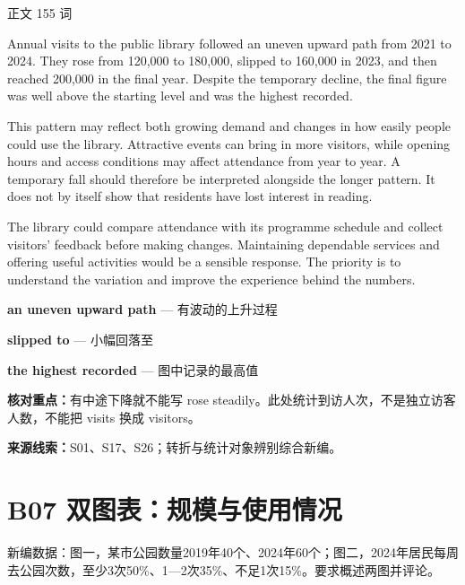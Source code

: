 \documentclass[11pt,a4paper,fontset=macnew]{ctexart}
\newenvironment{example}{\begingroup\fontsize{11}{14.3}\selectfont\setlength{\parskip}{4pt}}{\par\endgroup}
\begin{document}
\par\vspace{4pt}{\bfseries 完整套用示例}\par\nopagebreak
{\small 正文 155 词}\par
\begin{example}
Annual visits to the public library followed an uneven upward path from 2021 to 2024. They rose from 120,000 to 180,000, slipped to 160,000 in 2023, and then reached 200,000 in the final year. Despite the temporary decline, the final figure was well above the starting level and was the highest recorded.

This pattern may reflect both growing demand and changes in how easily people could use the library. Attractive events can bring in more visitors, while opening hours and access conditions may affect attendance from year to year. A temporary fall should therefore be interpreted alongside the longer pattern. It does not by itself show that residents have lost interest in reading.

The library could compare attendance with its programme schedule and collect visitors' feedback before making changes. Maintaining dependable services and offering useful activities would be a sensible response. The priority is to understand the variation and improve the experience behind the numbers.

\end{example}
\par\vspace{4pt}{\bfseries 好词好句：优先记这三处}\par\nopagebreak
{\small\textbf{an uneven upward path} — 有波动的上升过程}\par
{\small\textbf{slipped to} — 小幅回落至}\par
{\small\textbf{the highest recorded} — 图中记录的最高值}\par
{\small\textbf{核对重点：}有中途下降就不能写 rose steadily。此处统计到访人次，不是独立访客人数，不能把 visits 换成 visitors。}\par
{\fontsize{8}{10}\selectfont\textbf{来源线索：}S01、S17、S26；转折与统计对象辨别综合新编。}\par
\clearpage\section*{B07  双图表：规模与使用情况}
{\small 新编数据：图一，某市公园数量2019年40个、2024年60个；图二，2024年居民每周去公园次数，至少3次50\%、1—2次35\%、不足1次15\%。要求概述两图并评论。}\par
\end{document}
